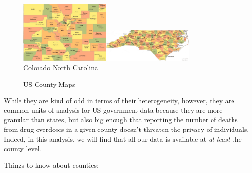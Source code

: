 \documentclass[12pt]{article}
\begin{document}
\begin{figure}[h!]
  \centering
  \caption{US County Maps}\label{counties}
  \includegraphics[width=0.4\textwidth]{images/CO_counties.jpg}\includegraphics[width=0.4\textwidth]{images/NC_counties.jpg}\\
  \scriptsize{Colorado \hspace*{5cm} North Carolina}
\end{figure}

While they are kind of odd in terms of their heterogeneity, however, they are common units of analysis for US government data because they are more granular than states, but also big enough that reporting the number of deaths from drug overdoses in a given county doesn't threaten the privacy of individuals. Indeed, in this analysis, we will find that all our data is available at \emph{at least} the county level.

Things to know about counties:
\end{document}
